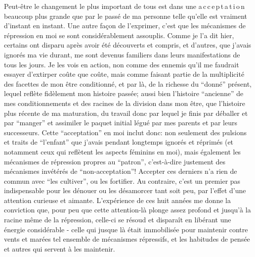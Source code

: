 Peut-être le changement le plus important de tous est dans une a\,c\,c\,e\,p\,t\,a\,t\,i\,o\,n beaucoup plus grande que par le passé de ma personne telle qu'elle est vraiment d'instant en instant. Une autre façon de l'exprimer, c'est que les mécanismes de répression en moi se sont considérablement assouplis. Comme je l'a dit hier, certains ont disparu après avoir été découverts et compris, et d'autres, que j'avais ignorés ma vie durant, me sont devenus familiers dans leurs manifestations de tous les jours. Je les vois en action, non comme des ennemis qu'il me faudrait essayer d'extirper coûte que coûte, mais comme faisant partie de la multiplicité des facettes de mon être conditionné, et par là, de la richesse du ``donné'' présent, lequel reflète fidèlement mon histoire passée; aussi bien l'histoire ``ancienne'' de mes conditionnements et des racines de la division dans mon être, que l'histoire plus récente de ma maturation, du travail donc par lequel je finis par déballer et par ``manger'' et assimiler le paquet initial légué par mes parents et par leurs successeurs. Cette ``acceptation'' en moi inclut donc: non seulement des pulsions et traits de ``l'enfant'' que j'avais pendant longtemps ignorés et réprimés (et notamment ceux qui reflètent les aspects féminins en moi), mais également les mécanismes de répression propres au ``patron'', c'est-à-dire justement des mécanismes invétérés de ``non-acceptation''! Accepter ces derniers n'a rien de commun avec ``les cultiver'', ou les fortifier. Au contraire, c'est un premier pas indispensable pour les dénouer ou les désamorcer tant soit peu, par l'effet d'une attention curieuse et aimante. L'expérience de ces huit années me donne la conviction que, pour peu que cette attention-là plonge assez profond et jusqu'à la racine même de la répression, celle-ci se résoud et disparaît en libérant une énergie considérable - celle qui jusque là était immobilisée pour maintenir contre vents et marées tel ensemble de mécanismes répressifs, et les habitudes de pensée et autres qui servent à les maintenir.

